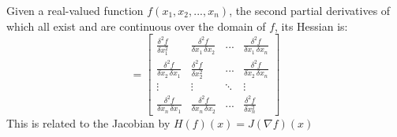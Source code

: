 \documentclass[10pt,landscape]{article}
\begin{document}
\begin{multicols}{3}
Given a real-valued function $f(x_1, x_2, ..., x_n)$, the second partial derivatives of which all exist and are continuous over the domain of $f$, its Hessian is:
\begin{equation*}
 = \left[ \begin{array}{cccc}
	\frac{\delta^2 f}{\delta x_1^2} & \frac{\delta^2 f}{\delta x_1\,\delta x_2} & ... & \frac{\delta^2 f}{\delta x_1\,\delta x_n}\\
	\frac{\delta^2 f}{\delta x_2\,\delta x_1} & \frac{\delta^2 f}{\delta x_2^2} & ... & \frac{\delta^2 f}{\delta x_2\,\delta x_n}\\
	\vdots & \vdots & \ddots & \vdots\\
	\frac{\delta^2 f}{\delta x_n\,\delta x_1} & \frac{\delta^2 f}{\delta x_n\,\delta x_2} & ... & \frac{\delta^2 f}{\delta x_n^2}
 \end{array} \right]
\end{equation*}
This is related to the Jacobian by $H(f)(x) = J(\nabla f)(x)$

\end{multicols}
\end{document}
